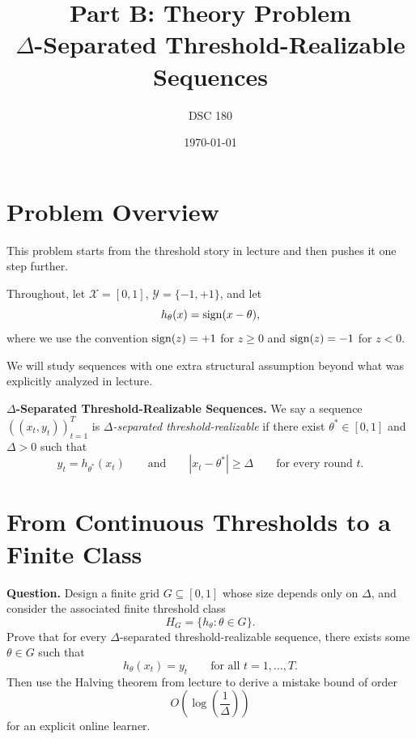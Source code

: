 \documentclass{article}
\title{\textbf{Part B: Theory Problem}\\[4pt]
       \large $\Delta$-Separated Threshold-Realizable Sequences}
\author{DSC 180}
\date{\today}
\begin{document}

\maketitle
\tableofcontents
\newpage

\section{Problem Overview}

This problem starts from the threshold story in lecture and then pushes it one
step further.

Throughout, let $\mathcal{X} = [0,1]$, $\mathcal{Y} = \{-1,+1\}$, and let
\[
h_\theta(x) = \operatorname{sign}(x-\theta),
\]
where we use the convention $\operatorname{sign}(z)=+1$ for $z \ge 0$ and $\operatorname{sign}(z)=-1$ for
$z<0$.

We will study sequences with one extra structural assumption beyond what was
explicitly analyzed in lecture.
\newline

\textbf{$\Delta$-Separated Threshold-Realizable Sequences.}
We say a sequence $((x_t,y_t))_{t=1}^T$ is \emph{$\Delta$-separated
threshold-realizable} if there exist $\theta^* \in [0,1]$ and $\Delta > 0$
such that
\[
y_t = h_{\theta^*}(x_t)
\qquad \text{and} \qquad
|x_t-\theta^*| \ge \Delta
\qquad \text{for every round } t.
\]

\qquad
\qquad

\section{From Continuous Thresholds to a Finite Class}

\textbf{Question.}
Design a finite grid $G \subseteq [0,1]$ whose size depends only on $\Delta$,
and consider the associated finite threshold class
\[
H_G = \{h_\theta : \theta \in G\}.
\]
Prove that for every $\Delta$-separated threshold-realizable sequence, there
exists some $\theta \in G$ such that
\[
h_\theta(x_t)=y_t
\qquad \text{for all } t=1,\dots,T.
\]
Then use the Halving theorem from lecture to derive a mistake bound of order
\[
O\!\left(\log\left(\frac{1}{\Delta}\right)\right)
\]
for an explicit online learner.
\end{document}
